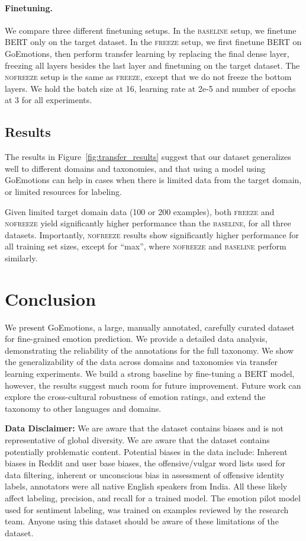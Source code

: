 \documentclass[11pt,a4paper]{article}
\begin{document}
\paragraph{Finetuning.} We compare three different finetuning setups. In the \textsc{baseline} setup, we finetune BERT only on the target dataset. In the \textsc{freeze} setup, we first finetune BERT on GoEmotions, then perform transfer learning by replacing the final dense layer, freezing all layers besides the last layer and finetuning on the target dataset. The \textsc{nofreeze} setup is the same as \textsc{freeze}, except that we do not freeze the bottom layers. We hold the batch size at 16, learning rate at 2e-5 and number of epochs at 3 for all experiments.



\subsection{Results}

The results in Figure~\ref{fig:transfer_results} suggest that our dataset generalizes well to different domains and taxonomies, and that using a model using GoEmotions can help in cases when there is limited data from the target domain, or limited resources for labeling.
 
 Given limited target domain data (100 or 200 examples), both \textsc{freeze} and \textsc{nofreeze} yield significantly higher performance than the \textsc{baseline}, for all three datasets. Importantly, \textsc{nofreeze} results show significantly higher performance for all training set sizes, except for ``max'', where \textsc{nofreeze} and \textsc{baseline} perform similarly.

 
\section{Conclusion}
We present GoEmotions, a large, manually annotated, carefully curated dataset for fine-grained emotion prediction. We provide a detailed data analysis, demonstrating the reliability of the annotations for the full taxonomy. We show the generalizability of the data across domains and taxonomies via transfer learning experiments. We build a strong baseline by fine-tuning a BERT model, however, the results suggest much room for future improvement.
Future work can explore the cross-cultural robustness of emotion ratings, and extend the taxonomy to other languages and domains.

\textbf{Data Disclaimer:} We are aware that the dataset contains biases and is not representative of global diversity. We are aware that the dataset contains potentially problematic content. Potential biases in the data include: Inherent biases in Reddit and user base biases, the offensive/vulgar word lists used for data filtering, inherent or unconscious bias in assessment of offensive identity labels, annotators were all native English speakers from India. All these likely affect labeling, precision, and recall for a trained model.
The emotion pilot model used for sentiment labeling, was trained on examples reviewed by the research team. Anyone using this dataset should be aware of these limitations of the dataset.
\end{document}
